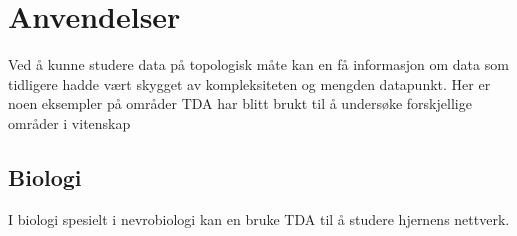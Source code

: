 \section{Anvendelser}
Ved å kunne studere data på topologisk måte kan en få informasjon om data som tidligere hadde vært skygget av kompleksiteten og mengden datapunkt. Her er noen eksempler på områder TDA har blitt brukt til å undersøke forskjellige områder i vitenskap

\subsection{Biologi}
I biologi spesielt i nevrobiologi kan en bruke TDA til å studere hjernens nettverk.